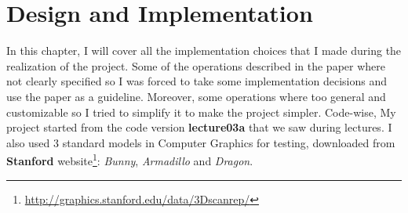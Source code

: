 \section{Design and Implementation}
In this chapter, I will cover all the implementation choices that I made during the realization of the project. Some of the operations described in the paper \cite{referencePaper} where not clearly specified so I was forced to take some implementation decisions and use the paper as a guideline. Moreover, some operations where too general and customizable so I tried to simplify it to make the project simpler. \newline
	Code-wise, My project started from the code version \textbf{lecture03a} that we saw during lectures. I also used 3 standard models in Computer Graphics for testing, downloaded from \textbf{Stanford} website\footnote{\url{http://graphics.stanford.edu/data/3Dscanrep/}}: \textit{Bunny}, \textit{Armadillo} and \textit{Dragon}.


